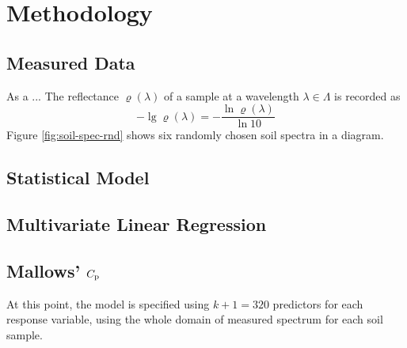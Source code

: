 \section{Methodology}
\label{sec:methodology}
	
	\subsection{Measured Data}
	\label{ssec:measured-data}
	
		As a ...
		The reflectance $\varrho(\lambda)$ of a sample at a wavelength $\lambda \in \Lambda$ is recorded as
		\[
			-\lg \varrho(\lambda) = -\frac{\ln \varrho(\lambda)}{\ln 10}
		\]
		Figure \ref{fig:soil-spec-rnd} shows six randomly chosen soil spectra in a diagram.
		\begin{figure*}
			\centering
			
			\caption{Six near infrared soil spectra of randomly chosen soil samples obtained from the data set, where $\lambda$ is the wavelength and $\rho(\lambda)$ the corresponding reflectance and each colour refers to one sample}
			\label{fig:soil-spec-rnd}
		\end{figure*}
		
	

	\subsection{Statistical Model}
	\label{ssec:statistical-model}
	
	
	

	

	\subsection{Multivariate Linear Regression}
	\label{ssec:mlr}
	
		


	\subsection{Mallows' $C_{\mathrm{p}}$}
	\label{ssec:mallows-C_p}
	
		At this point, the model is specified using $k+1 = 320$ predictors for each response variable, using the whole domain of measured spectrum for each soil sample.
		
		
	
